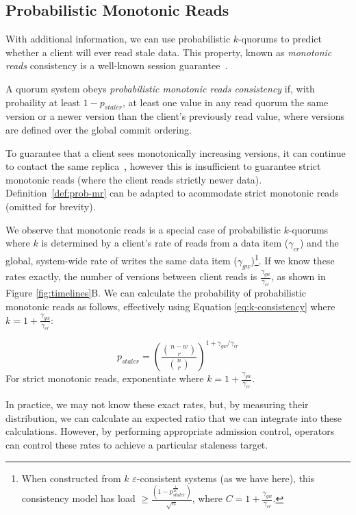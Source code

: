 \documentclass{vldb}
\begin{document}
\subsection{Probabilistic Monotonic Reads}

With additional information, we can use probabilistic $k$-quorums to
predict whether a client will ever read stale data.  This property,
known as \textit{monotonic reads} consistency is a well-known session
guarantee~\cite{sessionguarantees}.

\begin{definition}
\label{def:prob-mr}
A quorum system obeys \textit{probabilistic monotonic reads consistency} if, with probaility at least $1-p_{staler}$, at
least one value in any read quorum the same version or a newer version
than the client's previously read value, where versions are defined
over the global commit ordering.
\end{definition}

To guarantee that a client sees monotonically increasing versions, it
can continue to contact the same replica~\cite{vogels-defs}, however
this is insufficient to guarantee strict monotonic reads (where the
client reads strictly newer data).  Definition~\ref{def:prob-mr} can
be adapted to acommodate strict monotonic reads (omitted for brevity).

We observe that monotonic reads is a special case of probabilistic
$k$-quorums where $k$ is determined by a client's rate of reads from a
data item ($\gamma_{cr}$) and the global, system-wide rate of writes
the same data item ($\gamma_{gw}$)\footnote{When constructed from $k$
  $\varepsilon$-consistent systems (as we have here), this consistency
  model has load $\geq
  \frac{(1-p_{staler}^{\frac{1}{2C}})}{\sqrt{n}}$, where
  $C=1+\frac{\gamma_{gw}}{\gamma_{cr}}$.}.  If we know these rates
exactly, the number of versions between client reads is
$\frac{\gamma_{gw}}{\gamma_{cr}}$, as shown in Figure
\ref{fig:timelines}B.  We can calculate the probability of
probabilistic monotonic reads as follows, effectively using Equation
\ref{eq:k-consistency} where $k=1+\frac{\gamma_{gw}}{\gamma_{cr}}$:

\begin{equation}
\label{eq:prob-mr}
p_{staler} = \left(\frac{{n-w \choose r}}{{n \choose r}}\right)^{1+\gamma_{gw}/\gamma_{cr}}
\end{equation}
For strict monotonic reads, exponentiate where $k=1+\frac{\gamma_{gw}}{\gamma_{cr}}$.

In practice, we may not know these exact rates, but, by measuring
their distribution, we can calculate an expected ratio that we can
integrate into these calculations.  However, by performing appropriate
admission control, operators can control these rates to achieve a
particular staleness target.
\end{document}
